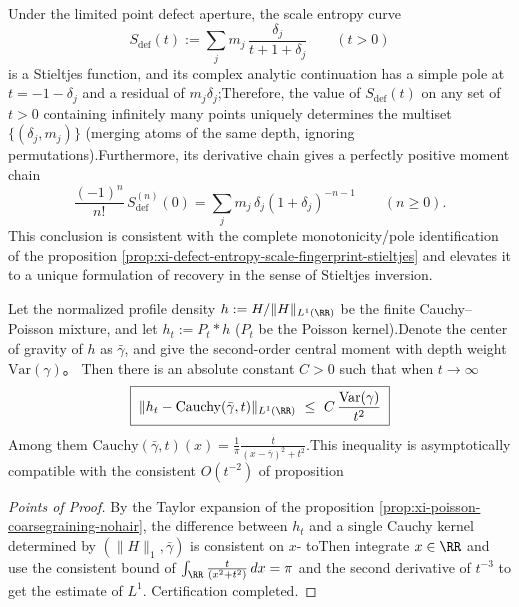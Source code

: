 \begin{corollary}\label{cor:dephys-stieltjes-inversion-scale-entropy}Under the limited point defect aperture, the scale entropy curve\[
S_{\mathrm{def}}(t):=\sum_j m_j\,\frac{\delta_j}{t+1+\delta_j}\qquad(t>0)
\]
is a Stieltjes function, and its complex analytic continuation has a simple pole at \(t=-1-\delta_j\) and a residual of \(m_j\delta_j\);Therefore, the value of \(S_{\mathrm{def}}(t)\) on any set of \(t>0\) containing infinitely many points uniquely determines the multiset \(\{(\delta_j,m_j)\}\) (merging atoms of the same depth, ignoring permutations).Furthermore, its derivative chain gives a perfectly positive moment chain\[
\boxed{\;
\frac{(-1)^n}{n!}\,S_{\mathrm{def}}^{(n)}(0)
=\sum_j m_j\,\delta_j(1+\delta_j)^{-n-1}\qquad(n\ge 0).\;}
\]
This conclusion is consistent with the complete monotonicity/pole identification of the proposition \ref{prop:xi-defect-entropy-scale-fingerprint-stieltjes} and elevates it to a unique formulation of recovery in the sense of Stieltjes inversion.\end{corollary}

\begin{corollary}\label{cor:dephys-poisson-tv-bound-variance}Let the normalized profile density \(h:=H/\|H\|_{L^1(\RR)}\) be the finite Cauchy--Poisson mixture, and let \(h_t:=P_t*h\) (\(P_t\) be the Poisson kernel).Denote the center of gravity of \(h\) as \(\bar\gamma\), and give the second-order central moment with depth weight\(
\mathrm{Var}(\gamma)
\)。
Then there is an absolute constant \(C>0\) such that when \(t\to\infty\)\[
\boxed{\;
\|h_t-\mathrm{Cauchy}(\bar\gamma,t)\|_{L^1(\RR)}
\ \le\ C\,\frac{\mathrm{Var}(\gamma)}{t^2}\;}
\]
Among them \(\mathrm{Cauchy}(\bar\gamma,t)(x)=\frac{1}{\pi}\frac{t}{(x-\bar\gamma)^2+t^2}\).This inequality is asymptotically compatible with the consistent \(O(t^{-2})\) of proposition\end{corollary}

\begin{proof}[Points of Proof]By the Taylor expansion of the proposition \ref{prop:xi-poisson-coarsegraining-nohair}, the difference between \(h_t\) and a single Cauchy kernel determined by \((\|H\|_1,\bar\gamma)\) is consistent on \(x\)- toThen integrate \(x\in\RR\) and use the consistent bound of \(\int_{\RR}\frac{t}{(x^2+t^2)}\,dx=\pi\) and the second derivative of \(t^{-3}\) to get the estimate of \(L^1\). Certification completed.\end{proof}

